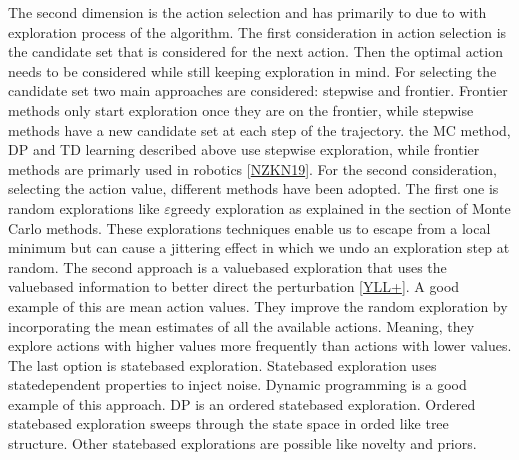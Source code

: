 \documentclass[letterpaper,10pt,english]{jupyterBook}
\begin{document}
\sphinxAtStartPar
The second dimension is the action selection and has primarily to due to with exploration process of the algorithm. The first consideration in action selection is the candidate set that is considered for the next action. Then the optimal action needs to be considered while still keeping exploration in mind. For selecting the candidate set two main approaches are considered: step\sphinxhyphen{}wise and frontier. Frontier methods only start exploration once they are on the frontier, while step\sphinxhyphen{}wise methods have a new candidate set at each step of the trajectory. the MC method, DP and TD learning described above use step\sphinxhyphen{}wise exploration, while frontier methods are primarly used in robotics {[}\hyperlink{cite.Discussion:id49}{NZKN19}{]}. For the second consideration, selecting the action value,  different methods have been adopted. The first one is random explorations like \(\varepsilon\)\sphinxhyphen{}greedy exploration as explained in the section of Monte Carlo methods. These explorations techniques enable us to escape from a local minimum but can cause a jittering effect in which we undo an exploration step at random. The second approach is a value\sphinxhyphen{}based exploration that uses the value\sphinxhyphen{}based information to better direct the perturbation {[}\hyperlink{cite.Discussion:id48}{YLL+}{]}. A good example of this are mean action values. They improve the random exploration by incorporating the mean estimates of all the available actions. Meaning, they explore actions with higher values more frequently than actions with lower values. The last option is state\sphinxhyphen{}based exploration. State\sphinxhyphen{}based exploration uses state\sphinxhyphen{}dependent properties to inject noise. Dynamic programming is a good example of this approach. DP is an ordered state\sphinxhyphen{}based exploration. Ordered state\sphinxhyphen{}based exploration sweeps through the state space in orded like tree structure. Other state\sphinxhyphen{}based explorations are possible like novelty and priors.
\end{document}
